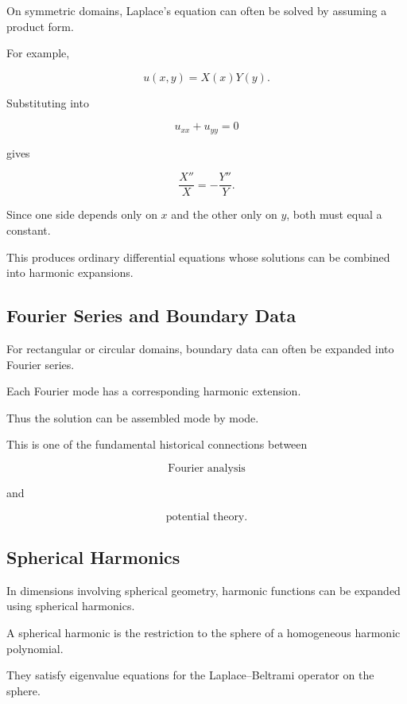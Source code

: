 On symmetric domains, Laplace's equation can often be solved by assuming
a product form.

For example,

\[
u(x,y)=X(x)Y(y).
\]

Substituting into

\[
u_{xx}+u_{yy}=0
\]

gives

\[
\frac{X''}{X}
=
-
\frac{Y''}{Y}.
\]

Since one side depends only on \(x\) and the other only on \(y\), both
must equal a constant.

This produces ordinary differential equations whose solutions can be
combined into harmonic expansions.

\subsection{Fourier Series and Boundary Data}
\label{subsec:potential-fourier-boundary}

For rectangular or circular domains, boundary data can often be expanded
into Fourier series.

Each Fourier mode has a corresponding harmonic extension.

Thus the solution can be assembled mode by mode.

This is one of the fundamental historical connections between

\[
\boxed{
\text{Fourier analysis}
}
\]

and

\[
\boxed{
\text{potential theory}.
}
\]

\subsection{Spherical Harmonics}
\label{subsec:potential-spherical-harmonics}

In dimensions involving spherical geometry, harmonic functions can be
expanded using spherical harmonics.

A spherical harmonic is the restriction to the sphere of a homogeneous
harmonic polynomial.

They satisfy eigenvalue equations for the Laplace--Beltrami operator on
the sphere.

